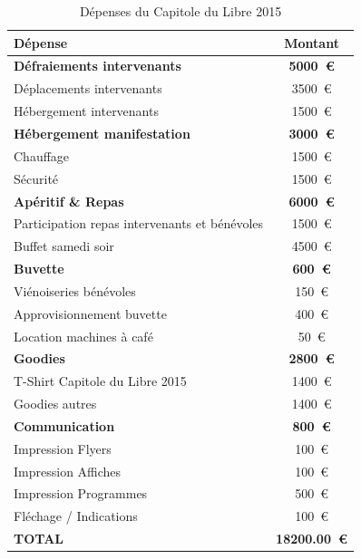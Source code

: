 \begin{table}[!h]
\begin{center}
	\caption{Dépenses du Capitole du Libre 2015}\label{tab_dépenses}
    \begin{tabular}{|l|c|}
        \hline Dépense & Montant \\
        \hline \textbf{Défraiements intervenants} & \textbf{\SI{5000}{\euro}} \\
        \hline Déplacements intervenants & \SI{3500}{\euro} \\
        \hline Hébergement intervenants & \SI{1500}{\euro} \\
        \hline \textbf{Hébergement manifestation} & \textbf{\SI{3000}{\euro}}\\
        \hline Chauffage & \SI{1500}{\euro} \\
        \hline Sécurité & \SI{1500}{\euro} \\
        \hline \textbf{Apéritif \& Repas} & \textbf{\SI{6000}{\euro}}\\
        \hline Participation repas intervenants et bénévoles & \SI{1500}{\euro} \\
        \hline Buffet samedi soir & \SI{4500}{\euro} \\
        \hline \textbf{Buvette} & \textbf{\SI{600}{\euro}}\\
        \hline Viénoiseries bénévoles & \SI{150}{\euro} \\
        \hline Approvisionnement buvette & \SI{400}{\euro} \\
        \hline Location machines à café & \SI{50}{\euro} \\
        \hline \textbf{Goodies} & \textbf{\SI{2800}{\euro} }\\
        \hline T-Shirt Capitole du Libre 2015 & \SI{1400}{\euro} \\
        \hline Goodies autres & \SI{1400}{\euro} \\
        \hline \textbf{Communication} & \textbf{\SI{800}{\euro}} \\
        \hline Impression Flyers & \SI{100}{\euro} \\
        \hline Impression Affiches & \SI{100}{\euro} \\
        \hline Impression Programmes & \SI{500}{\euro} \\
        \hline Fléchage / Indications & \SI{100}{\euro} \\
        \hline
        \hline \textbf{TOTAL} & \textbf{\SI{18200.00}{\euro}} \\
        \hline
    \end{tabular}
\end{center}
\end{table}

